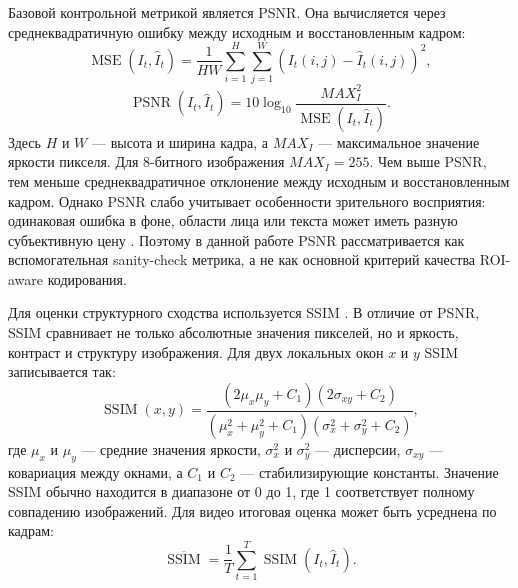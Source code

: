 \documentclass[12pt,a4paper,oneside,openany]{report}
\begin{document}
Базовой контрольной метрикой является PSNR. Она вычисляется через среднеквадратичную ошибку между исходным и восстановленным кадром:
\begin{equation}\operatorname{MSE}(I_t,\hat{I}_t)=\frac{1}{HW}\sum_{i=1}^{H}\sum_{j=1}^{W}\left(I_t(i,j)-\hat{I}_t(i,j)\right)^2,\label{eq:video_mse}
\end{equation}
\begin{equation}\operatorname{PSNR}(I_t,\hat{I}_t)=10\log_{10}\frac{MAX_I^2}{\operatorname{MSE}(I_t,\hat{I}_t)}.\label{eq:video_psnr}
\end{equation}Здесь $H$ и $W$ --- высота и ширина кадра, а $MAX_I$ --- максимальное значение яркости пикселя. Для 8-битного изображения $MAX_I=255$. Чем выше PSNR, тем меньше среднеквадратичное отклонение между исходным и восстановленным кадром. Однако PSNR слабо учитывает особенности зрительного восприятия: одинаковая ошибка в фоне, области лица или текста может иметь разную субъективную цену \cite{psnr}. Поэтому в данной работе PSNR рассматривается как вспомогательная sanity-check метрика, а не как основной критерий качества ROI-aware кодирования.

Для оценки структурного сходства используется SSIM \cite{ssim}. В отличие от PSNR, SSIM сравнивает не только абсолютные значения пикселей, но и яркость, контраст и структуру изображения. Для двух локальных окон $x$ и $y$ SSIM записывается так:
\begin{equation}\operatorname{SSIM}(x,y)=\frac{(2\mu_x\mu_y+C_1)(2\sigma_{xy}+C_2)}{(\mu_x^2+\mu_y^2+C_1)(\sigma_x^2+\sigma_y^2+C_2)},\label{eq:video_ssim}
\end{equation}где $\mu_x$ и $\mu_y$ --- средние значения яркости, $\sigma_x^2$ и $\sigma_y^2$ --- дисперсии, $\sigma_{xy}$ --- ковариация между окнами, а $C_1$ и $C_2$ --- стабилизирующие константы. Значение SSIM обычно находится в диапазоне от 0 до 1, где 1 соответствует полному совпадению изображений. Для видео итоговая оценка может быть усреднена по кадрам:
\begin{equation}\overline{\operatorname{SSIM}}=\frac{1}{T}\sum_{t=1}^{T}\operatorname{SSIM}(I_t,\hat{I}_t).\label{eq:video_ssim_avg}
\end{equation}
\end{document}
